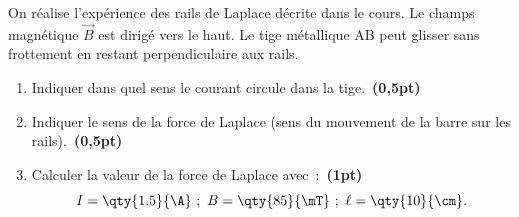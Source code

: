 \begin{minipage}[t][][t]{0.60\linewidth}
    On réalise l'expérience des rails de Laplace décrite dans le cours. Le
    champs magnétique $\vec{B}$ est dirigé vers le haut. Le tige métallique AB
    peut glisser sans frottement en restant perpendiculaire aux rails.
\end{minipage}
\hfill
\begin{minipage}[t][][t]{0.38\linewidth}
    \vspace{-5mm}
    \begin{figure}[H]
        \centering
    \end{figure}
\end{minipage}

\vspace{-5mm}
\begin{enumerate}
    \item Indiquer dans quel sens le courant circule dans la
          tige.~\textbf{(0,5pt)}
    \item Indiquer le sens de la force de Laplace (sens du mouvement de la barre
          sur les rails).~\textbf{(0,5pt)}
    \item Calculer la valeur de la force de Laplace avec~:~\textbf{(1pt)}
          \[
              I=\qty{1.5}{\A}~;~B=\qty{85}{\mT}~;~\ell=\qty{10}{\cm}.
          \]
\end{enumerate}


